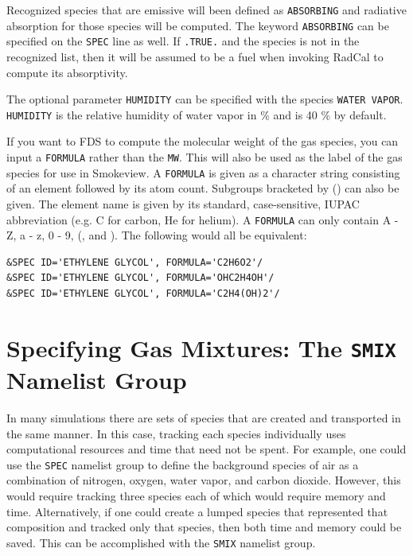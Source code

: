 \documentclass[11pt]{book}
\newcommand{\ct}{\tt\small}
\begin{document}
Recognized species that are emissive will been defined as {\ct ABSORBING} and radiative absorption for those species
will be computed.  The keyword {\ct ABSORBING} can be specified on the {\ct SPEC} line as well.  If {\ct .TRUE.} and the
species is not in the recognized list, then it will be assumed to be a fuel when invoking RadCal to compute its
absorptivity.

The optional parameter {\ct HUMIDITY} can be specified with the species {\ct WATER VAPOR}.  {\ct HUMIDITY} is the relative humidity of water vapor in \% and is 40 \% by default.

If you want to FDS to compute the molecular weight of the gas species, you can input a {\ct FORMULA} rather than the {\ct MW}.  This will also be used as the label of the gas species for use in Smokeview.  A {\ct FORMULA} is given as a character string consisting of an element followed by its atom count.  Subgroups bracketed by () can also be given.  The element name is given by its standard, case-sensitive, IUPAC abbreviation (e.g. C for carbon, He for helium).  A {\ct FORMULA} can only contain A - Z, a - z, 0 - 9, (, and ).  The following would all be equivalent:

\footnotesize
\begin{verbatim}
&SPEC ID='ETHYLENE GLYCOL', FORMULA='C2H6O2'/
&SPEC ID='ETHYLENE GLYCOL', FORMULA='OHC2H4OH'/
&SPEC ID='ETHYLENE GLYCOL', FORMULA='C2H4(OH)2'/
\end{verbatim} \normalsize


\clearpage

\section{Specifying Gas Mixtures: The \texorpdfstring{{\tt SMIX}}{SMIX} Namelist Group}
\label{info:SMIX}

In many simulations there are sets of species that are created and transported in the same manner.
In this case, tracking each species individually uses computational resources and time that need not be spent.
For example, one could use the {\ct SPEC} namelist group to define the background species of air as a combination of nitrogen, oxygen, water vapor, and carbon dioxide.
However, this would require tracking three species each of which would require memory and time.
Alternatively, if one could create a lumped species that represented that composition and tracked only that species,
then both time and memory could be saved. This can be accomplished with the {\ct SMIX} namelist group.
\end{document}
